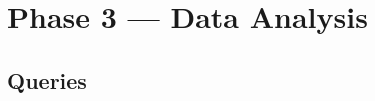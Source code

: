 \section{Phase 3 — Data Analysis}

\subsection{Queries}



\inputminted{scala}{../../code/p3_analysis.scala}

